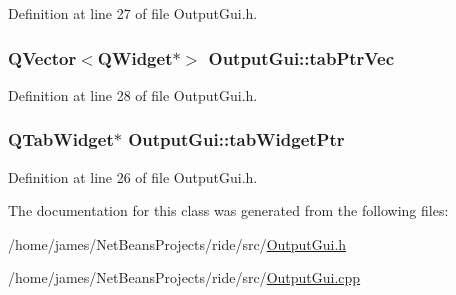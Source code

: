 Definition at line 27 of file Output\-Gui.\-h.

\hypertarget{class_output_gui_a669643ee3eabbe9b198bcb43f56ae053}{
\subsubsection[{tab\-Ptr\-Vec}]{\setlength{\rightskip}{0pt plus 5cm}Q\-Vector$<$Q\-Widget$\ast$$>$ Output\-Gui\-::tab\-Ptr\-Vec\hspace{0.3cm}{\ttfamily [private]}}}\label{class_output_gui_a669643ee3eabbe9b198bcb43f56ae053}


Definition at line 28 of file Output\-Gui.\-h.

\hypertarget{class_output_gui_a2f8f77a6c77ee8bb00088be2de61c93b}{
\subsubsection[{tab\-Widget\-Ptr}]{\setlength{\rightskip}{0pt plus 5cm}Q\-Tab\-Widget$\ast$ Output\-Gui\-::tab\-Widget\-Ptr\hspace{0.3cm}{\ttfamily [private]}}}\label{class_output_gui_a2f8f77a6c77ee8bb00088be2de61c93b}


Definition at line 26 of file Output\-Gui.\-h.



The documentation for this class was generated from the following files\-:\begin{DoxyCompactItemize}
\item 
/home/james/\-Net\-Beans\-Projects/ride/src/\hyperlink{_output_gui_8h}{Output\-Gui.\-h}\item 
/home/james/\-Net\-Beans\-Projects/ride/src/\hyperlink{_output_gui_8cpp}{Output\-Gui.\-cpp}\end{DoxyCompactItemize}
